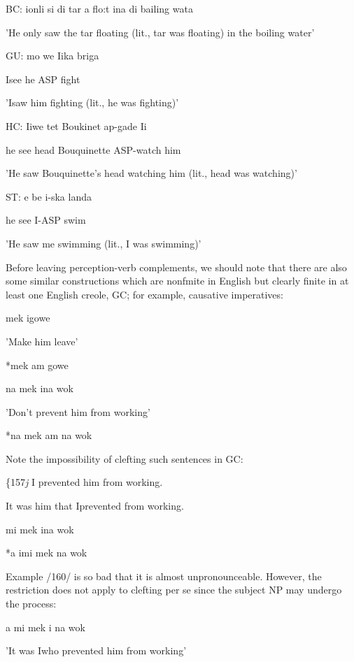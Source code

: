 \ea\label{ex:149}
 BC: ionli si di tar a flo:t ina di bailing wata
\glt
\z

'He only saw the tar floating (lit., tar was floating) in the boiling water'

\ea\label{ex:150}
 GU: mo we Iika briga
\glt
\z

Isee he ASP fight

'Isaw him fighting (lit., he was fighting)'

\ea\label{ex:151}
 HC: Iiwe tet Boukinet ap-gade Ii
\glt
\z

he see head Bouquinette ASP-watch him

'He saw Bouquinette's head watching him (lit., head was watching)'

\ea\label{ex:152}
 ST: e be i-ska landa
\glt
\z

he see I-ASP swim

'He saw me swimming (lit., I was swimming)'

Before leaving perception-verb complements, we should note that there are also some similar constructions which are nonfmite in English but clearly finite in at least one English creole, GC; for example, causative imperatives:

\ea\label{ex:153}
 mek igowe
\glt
\z

'Make him leave'

\ea\label{ex:154}
 *mek am gowe
\glt
\z

\ea\label{ex:155}
 na mek ina wok
\glt
\z

'Don't prevent him from working'


\ea\label{ex:156}
 *na mek am na wok
\glt
\z

Note the impossibility of clefting such sentences in GC:

\{157\textit{j} I prevented him from working.

\ea\label{ex:158}
 It was him that Iprevented from working.
\glt
\z

\ea\label{ex:159}
 mi mek ina wok
\glt
\z

\ea\label{ex:160}
 *a imi mek na wok
\glt
\z

Example /160/ is so bad that it is almost unpronounceable. However, the restriction does not apply to clefting per se since the subject NP may undergo the process:

\ea\label{ex:161}
 a mi mek i na wok
\glt
\z

'It was Iwho prevented him from working'


